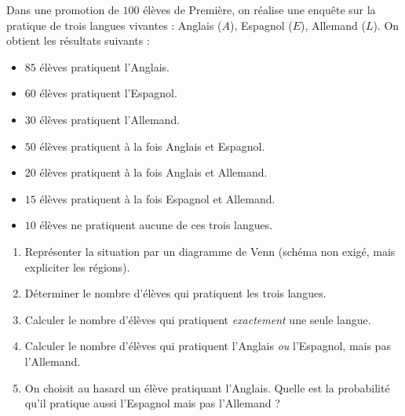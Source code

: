 \documentclass[11pt]{article}
\begin{document}
\begin{exercice}
Dans une promotion de $100$ élèves de Première, on réalise une enquête sur la pratique de trois langues vivantes : Anglais ($A$), Espagnol ($E$), Allemand ($L$). On obtient les résultats suivants :
\begin{itemize}
    \item $85$ élèves pratiquent l'Anglais.
    \item $60$ élèves pratiquent l'Espagnol.
    \item $30$ élèves pratiquent l'Allemand.
    \item $50$ élèves pratiquent à la fois Anglais et Espagnol.
    \item $20$ élèves pratiquent à la fois Anglais et Allemand.
    \item $15$ élèves pratiquent à la fois Espagnol et Allemand.
    \item $10$ élèves ne pratiquent aucune de ces trois langues.
\end{itemize}
\begin{enumerate}
    \item Représenter la situation par un diagramme de Venn (schéma non exigé, mais expliciter les régions).
    \item Déterminer le nombre d'élèves qui pratiquent les trois langues.
    \item Calculer le nombre d'élèves qui pratiquent \textit{exactement} une seule langue.
    \item Calculer le nombre d'élèves qui pratiquent l'Anglais \textit{ou} l'Espagnol, mais pas l'Allemand.
    \item On choisit au hasard un élève pratiquant l'Anglais. Quelle est la probabilité qu'il pratique aussi l'Espagnol mais pas l'Allemand ?
\end{enumerate}
\end{exercice}
\end{document}
